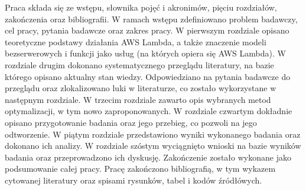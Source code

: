 Praca składa się ze wstępu, słownika pojęć i akronimów, pięciu rozdziałów, zakończenia oraz bibliografii.
W ramach wstępu zdefiniowano problem badawczy, cel pracy, pytania badawcze oraz zakres pracy.
W pierwszym rozdziale opisano teoretyczne podstawy działania AWS Lambda, a także znaczenie modeli bezserwerowych i funkcji jako usług (na których opiera się AWS Lambda).
W rozdziale drugim dokonano systematycznego przeglądu literatury, na bazie którego opisano aktualny stan wiedzy.
Odpowiedziano na pytania badawcze do przeglądu oraz zlokalizowano luki w literaturze, co zostało wykorzystane w następnym rozdziale.
W trzecim rozdziale zawarto opis wybranych metod optymalizacji, w tym nowo zaproponowanych.
W rozdziale czwartym dokładnie opisano przygotowanie badania oraz jego przebieg, co pozwoli na jego odtworzenie.
W piątym rozdziale przedstawiono wyniki wykonanego badania oraz dokonano ich analizy.
W rozdziale szóstym wyciągnięto wnioski na bazie wyników badania oraz przeprowadzono ich dyskusję.
Zakończenie zostało wykonane jako podsumowanie całej pracy.
Pracę zakończono bibliografią, w tym wykazem cytowanej literatury oraz spisami rysunków, tabel i kodów źródłówych.
